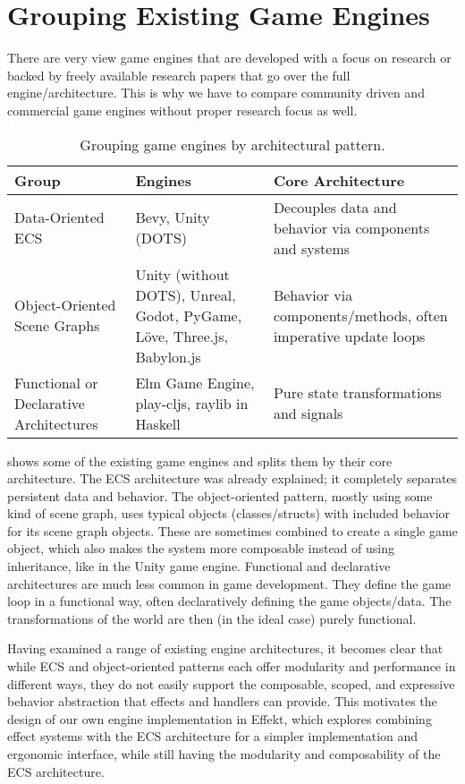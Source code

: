 \section{Grouping Existing Game Engines}

There are very view game engines that are developed with a focus on research or backed by freely available research papers that go over the full engine/architecture. This is why we have to compare community driven and commercial game engines without proper research focus as well.

\begin{table}[h!]
\centering
\begin{tabular}{p{4cm}p{4cm}p{4cm}}
\hline
\textbf{Group} & \textbf{Engines} & \textbf{Core Architecture} \\
\hline
Data-Oriented ECS &
Bevy, Unity (DOTS) &
Decouples data and behavior via components and systems \\
\hline
Object-Oriented Scene Graphs &
Unity (without DOTS), Unreal, Godot, PyGame, Löve, Three.js, Babylon.js &
Behavior via components/methods, often imperative update loops \\
\hline
Functional or Declarative Architectures &
Elm Game Engine, play-cljs, raylib in Haskell &
Pure state transformations and signals \\
\hline
\end{tabular}
\caption{Grouping game engines by architectural pattern.}
\label{tab:grouping}
\end{table}

 shows some of the existing game engines and splits them by their core architecture. The ECS architecture was already explained; it completely separates persistent data and behavior. The object-oriented pattern, mostly using some kind of scene graph, uses typical objects (classes/structs) with included behavior for its scene graph objects. These are sometimes combined to create a single game object, which also makes the system more composable instead of using inheritance, like in the Unity game engine. Functional and declarative architectures are much less common in game development. They define the game loop in a functional way, often declaratively defining the game objects/data. The transformations of the world are then (in the ideal case) purely functional.

Having examined a range of existing engine architectures, it becomes clear that while ECS and object-oriented patterns each offer modularity and performance in different ways, they do not easily support the composable, scoped, and expressive behavior abstraction that effects and handlers can provide. This motivates the design of our own engine implementation in Effekt, which explores combining effect systems with the ECS architecture for a simpler implementation and ergonomic interface, while still having the modularity and composability of the ECS architecture.
